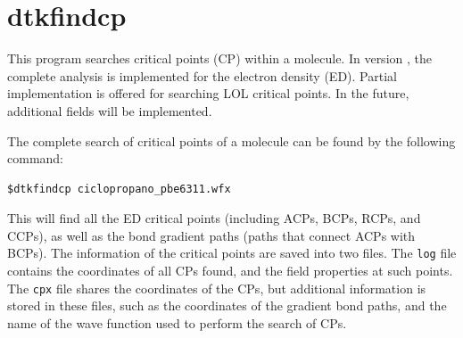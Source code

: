 \section{dtkfindcp}\label{sec:dtkfindcp}

This program searches critical points (CP) within a molecule. In version \dtkversion, the complete analysis is implemented for the electron density (ED). Partial implementation is offered for searching LOL critical points. In the future, additional fields will be implemented.

The complete search of critical points of a molecule can be found by the following command:\\
\begin{lstlisting}
$dtkfindcp ciclopropano_pbe6311.wfx 
\end{lstlisting}
This will find all the ED critical points (including ACPs, BCPs, RCPs, and CCPs), as well as the bond gradient paths (paths that connect ACPs with BCPs). The information of the critical points are saved into two files. The \texttt{log} file contains the coordinates of all CPs found, and the field properties at such points. The \texttt{cpx} file shares the coordinates of the CPs, but additional information is stored in these files, such as the coordinates of the gradient bond paths, and the name of the wave function used to perform the search of CPs.

